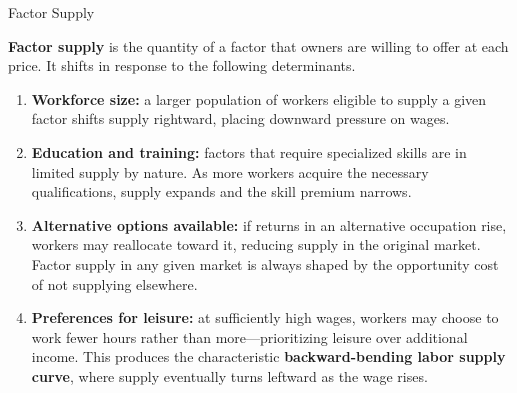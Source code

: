 \documentclass[10pt]{article}
\begin{document}
  \begin{core}{Factor Supply}

    \textbf{Factor supply} is the quantity of a factor that owners are willing to offer at each price. It shifts in response to the following determinants.

    \begin{enumerate}

      \item \textbf{Workforce size:} a larger population of workers eligible to supply a given factor shifts supply rightward, placing downward pressure on wages.

      \item \textbf{Education and training:} factors that require specialized skills are in limited supply by nature. As more workers acquire the necessary qualifications, supply expands and the skill premium narrows.

      \item \textbf{Alternative options available:} if returns in an alternative occupation rise, workers may reallocate toward it, reducing supply in the original market. Factor supply in any given market is always shaped by the opportunity cost of not supplying elsewhere.

      \item \textbf{Preferences for leisure:} at sufficiently high wages, workers may choose to work fewer hours rather than more---prioritizing leisure over additional income. This produces the characteristic \textbf{backward-bending labor supply curve}, where supply eventually turns leftward as the wage rises.


    \end{enumerate}

  \end{core}
\end{document}
